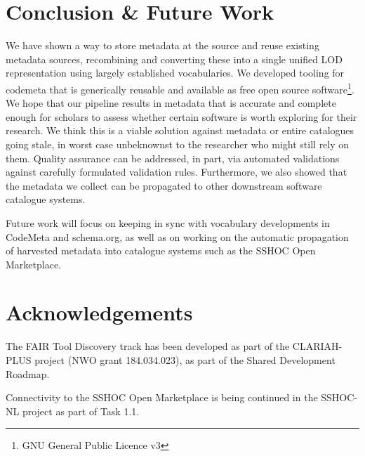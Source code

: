 \documentclass[a4paper,11pt]{article}
\begin{document}
\section{Conclusion \& Future Work}

We have shown a way to store metadata at the source and reuse existing metadata
sources, recombining and converting these into a single unified LOD
representation using largely established vocabularies. We developed tooling for
codemeta that is generically reusable and available as free open source
software\footnote{GNU General Public Licence v3}. We hope that our pipeline
results in metadata that is accurate and complete enough for scholars to assess
whether certain software is worth exploring for their research. We think this
is a viable solution against metadata or entire catalogues going stale, in
worst case unbeknownst to the researcher who might still rely on them. Quality
assurance can be addressed, in part, via automated validations against
carefully formulated validation rules. Furthermore, we also showed that the
metadata we collect can be propagated to other downstream software
catalogue systems.

Future work will focus on keeping in sync with vocabulary developments in
CodeMeta and schema.org, as well as on working on the automatic propagation of
harvested metadata into catalogue systems such as the SSHOC Open Marketplace.

\section*{Acknowledgements}

The FAIR Tool Discovery track has been developed as part of the CLARIAH-PLUS
project (NWO grant 184.034.023), as part of the Shared Development Roadmap.

Connectivity to the SSHOC Open Marketplace is being continued in the 
SSHOC-NL project as part of Task 1.1.

\printbibliography
\end{document}
